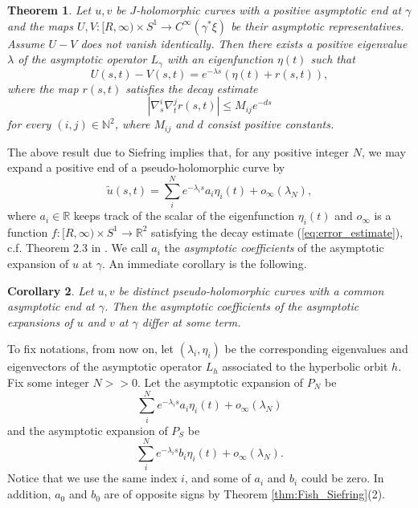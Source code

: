 \documentclass{article}
\numberwithin{equation}{section}
\newtheorem{theorem}{Theorem}[section]
\newtheorem{corollary}[theorem]{Corollary}
\theoremstyle{definition}
\newcommand{\R}{\mathbb{R}}
\begin{document}
\begin{theorem}\cite[Theorem 2.2]{Siefring}
\label{thm:Siefring_2_2}
    Let $u,v$ be $J$-holomorphic curves with a positive asymptotic end at $\gamma$ and the maps $U,V:[R,\infty) \times S^1 \to C^\infty(\gamma^*\xi)$ be their asymptotic representatives. Assume $U-V$ does not vanish identically. Then there exists a positive eigenvalue $\lambda$ of the asymptotic operator $L_\gamma$ with an eigenfunction $\eta(t)$ such that
    \begin{equation}
        U(s,t) - V(s,t) = e^{-\lambda s}(\eta(t) + r(s,t)),
    \end{equation}
    where the map $r(s,t)$ satisfies the decay estimate
    \begin{equation}
    \label{eq:error_estimate}
    |\nabla_s^i \nabla_t^j r(s,t)|\leq M_{ij} e^{-ds}
    \end{equation}
    for every $(i,j)\in \mathbb{N}^2$, where $M_{ij}$ and $d$ consist positive constants.
\end{theorem}


The above result due to Siefring implies that, for any positive integer $N$, we may expand a positive end of a pseudo-holomorphic curve by 
\begin{equation}
\widetilde{u}(s,t) = \sum_i^N e^{-\lambda_i s} a_i \eta_i(t) + o_\infty(\lambda_N),
\end{equation} 
where $a_i \in \R$ keeps track of the scalar of the eigenfunction $\eta_i(t)$ and $o_\infty$ is a function $f: [R, \infty) \times S^1 \to \mathbb{R}^2$ satisfying the decay estimate (\ref{eq:error_estimate}), c.f. Theorem 2.3 in \cite{Siefring}. We call $a_i$ the \emph{asymptotic coefficients} of the asymptotic expansion of $u$ at $\gamma$. An immediate corollary is the following.


\begin{corollary}
\label{cor:different_curves_different_coefficient}
    Let $u,v$ be distinct pseudo-holomorphic curves with a common asymptotic end at $\gamma$. Then the asymptotic coefficients of the asymptotic expansions of $u$ and $v$ at $\gamma$ differ at some term. 
\end{corollary}

To fix notations, from now on, let $(\lambda_i, \eta_i)$ be the corresponding eigenvalues and eigenvectors of the asymptotic operator $L_h$ associated to the hyperbolic orbit $h$. Fix some integer $N>>0$. Let the asymptotic expansion of $P_N$ be 
$$\sum_i^N e^{-\lambda_i s} a_i \eta_i(t) +o_\infty(\lambda_N)$$ 
and the asymptotic expansion of $P_S$ be 
$$\sum_i^N e^{-\lambda_i s} b_i \eta_i(t) +o_\infty(\lambda_N).$$ 
Notice that we use the same index $i$, and some of $a_i$ and $b_i$ could be zero. In addition, $a_0$ and $b_0$ are of opposite signs by Theorem \ref{thm:Fish_Siefring}(2).
\end{document}
